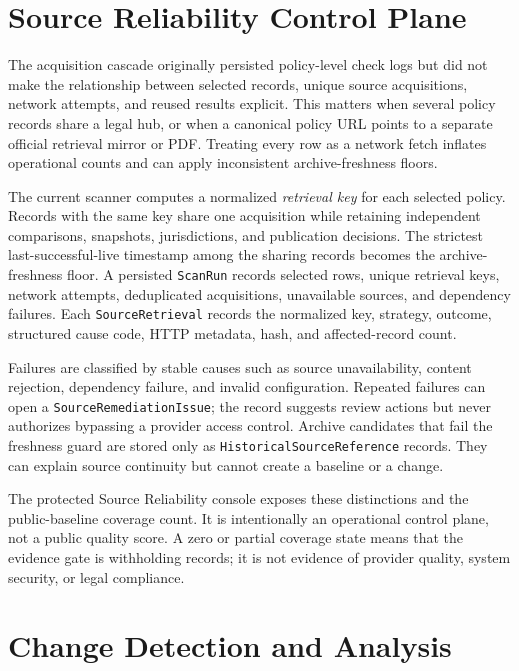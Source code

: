 \documentclass[11pt]{article}
\begin{document}
\section{Source Reliability Control Plane}
\label{sec:reliability}

The acquisition cascade originally persisted policy-level check logs but did
not make the relationship between selected records, unique source acquisitions,
network attempts, and reused results explicit. This matters when several policy
records share a legal hub, or when a canonical policy URL points to a separate
official retrieval mirror or PDF. Treating every row as a network fetch inflates
operational counts and can apply inconsistent archive-freshness floors.

The current scanner computes a normalized \emph{retrieval key} for each selected
policy. Records with the same key share one acquisition while retaining
independent comparisons, snapshots, jurisdictions, and publication decisions.
The strictest last-successful-live timestamp among the sharing records becomes
the archive-freshness floor. A persisted \texttt{ScanRun} records selected rows,
unique retrieval keys, network attempts, deduplicated acquisitions, unavailable
sources, and dependency failures. Each \texttt{SourceRetrieval} records the
normalized key, strategy, outcome, structured cause code, HTTP metadata, hash,
and affected-record count.

Failures are classified by stable causes such as source unavailability, content
rejection, dependency failure, and invalid configuration. Repeated failures can
open a \texttt{SourceRemediationIssue}; the record suggests review actions but
never authorizes bypassing a provider access control. Archive candidates that
fail the freshness guard are stored only as
\texttt{HistoricalSourceReference} records. They can explain source continuity
but cannot create a baseline or a change.

The protected Source Reliability console exposes these distinctions and the
public-baseline coverage count. It is intentionally an operational control
plane, not a public quality score. A zero or partial coverage state means that
the evidence gate is withholding records; it is not evidence of provider
quality, system security, or legal compliance.

\section{Change Detection and Analysis}
\label{sec:analysis}
\end{document}
